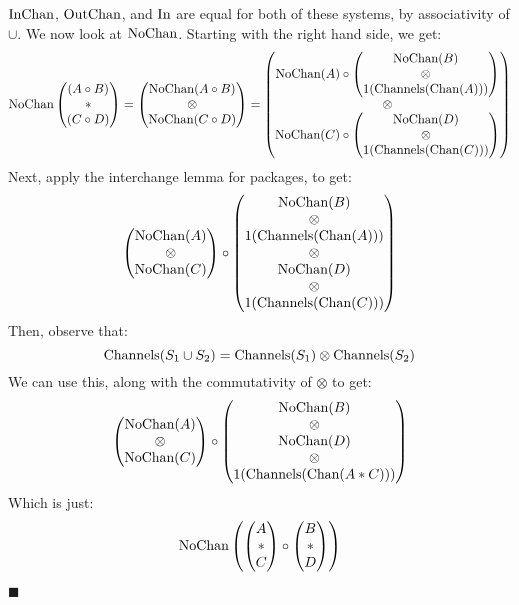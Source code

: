 \begin{lemma}
 $\text{InChan}$, $\text{OutChan}$, and $\text{In}$ are equal for
both of these systems, by associativity of $\cup$.
We now look at $\text{NoChan}$.
Starting with the right hand side, we get:
$$
\text{NoChan}
\begin{pmatrix} 
  (A \circ B)\cr
*\cr
  (C \circ D)\cr
\end{pmatrix} 
= 
\begin{pmatrix}
  \text{NoChan}(A \circ B)\cr
  \otimes\cr
  \text{NoChan}(C \circ D)
\end{pmatrix}
=
\begin{pmatrix}
    \text{NoChan}(A) \circ
    \begin{pmatrix}
      \text{NoChan}(B)\cr
      \otimes\cr
      1(\text{Channels}(\text{Chan}(A)))
    \end{pmatrix}
  \cr
  \otimes\cr
    \text{NoChan}(C) \circ
    \begin{pmatrix}
      \text{NoChan}(D)\cr
      \otimes\cr
      1(\text{Channels}(\text{Chan}(C)))
    \end{pmatrix}
\end{pmatrix}
$$
Next, apply the interchange lemma for packages, to get:
$$
\begin{pmatrix}
  \text{NoChan}(A)\cr
  \otimes\cr
  \text{NoChan}(C)
\end{pmatrix}
\circ
\begin{pmatrix}
  \text{NoChan}(B)\cr
  \otimes\cr
  1(\text{Channels}(\text{Chan}(A)))\cr
  \otimes\cr
  \text{NoChan}(D)\cr
  \otimes\cr
  1(\text{Channels}(\text{Chan}(C)))\cr
\end{pmatrix}
$$
Then, observe that:
$$
\text{Channels}(S_1 \cup S_2) = \text{Channels}(S_1) \otimes \text{Channels}(S_2)
$$
We can use this, along with the commutativity of $\otimes$ to get:
$$
\begin{pmatrix}
  \text{NoChan}(A)\cr
  \otimes\cr
  \text{NoChan}(C)
\end{pmatrix}
\circ
\begin{pmatrix}
  \text{NoChan}(B)\cr
  \otimes\cr
  \text{NoChan}(D)\cr
  \otimes\cr
  1(\text{Channels}(\text{Chan}(A * C)))\cr
\end{pmatrix}
$$
Which is just:
$$
\text{NoChan}
\left(
\begin{pmatrix} 
A\cr
*\cr
C\cr
\end{pmatrix} 
\circ
\begin{pmatrix} 
B\cr
*\cr
D\cr
\end{pmatrix} 
\right)
$$

$\blacksquare$
\end{lemma}

